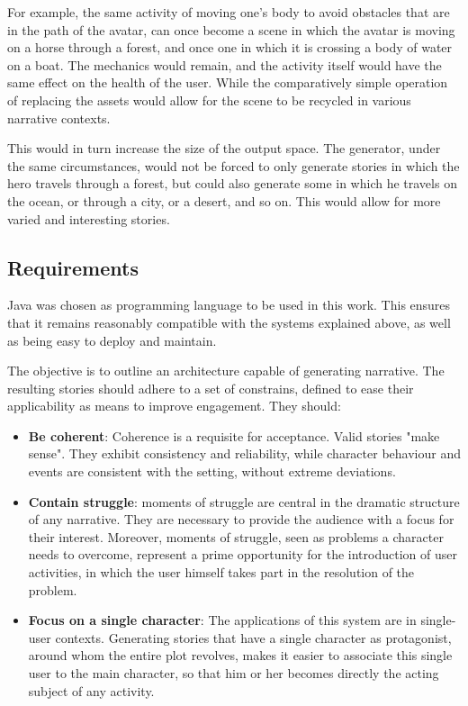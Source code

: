 \documentclass[12pt,a4paper,oneside]{report}
\begin{document}
For example, the same activity of moving one's body to avoid obstacles that are in the path of the avatar, can once become a scene in which the avatar is moving on a horse through a forest, and once one in which it is crossing a body of water on a boat. The mechanics would remain, and the activity itself would have the same effect on the health of the user. While the comparatively simple operation of replacing the assets would allow for the scene to be recycled in various narrative contexts.

This would in turn increase the size of the output space. The generator, under the same circumstances, would not be forced to only generate stories in which the hero travels through a forest, but could also generate some in which he travels on the ocean, or through a city, or a desert, and so on. This would allow for more varied and interesting stories.

\pagebreak

\subsection{Requirements}
Java was chosen as programming language to be used in this work. This ensures that it remains reasonably compatible with the systems explained above, as well as being easy to deploy and maintain.

The objective is to outline an architecture capable of generating narrative. The resulting stories should adhere to a set of constrains, defined to ease their applicability as means to improve engagement. They should:

\begin{itemize}\setlength{\itemsep}{8pt}
\item \textbf{Be coherent}: Coherence is a requisite for acceptance. Valid stories "make sense". They exhibit consistency and reliability, while character behaviour and events are consistent with the setting, without extreme deviations.

\item \textbf{Contain struggle}: moments of struggle are central in the dramatic structure of any narrative. They are necessary to provide the audience with a focus for their interest. Moreover, moments of struggle, seen as problems a character needs to overcome, represent a prime opportunity for the introduction of user activities, in which the user himself takes part in the resolution of the problem.

\item \textbf{Focus on a single character}: The applications of this system are in single-user contexts. Generating stories that have a single character as protagonist, around whom the entire plot revolves, makes it easier to associate this single user to the main character, so that him or her becomes directly the acting subject of any activity.
\end{itemize}
\end{document}
